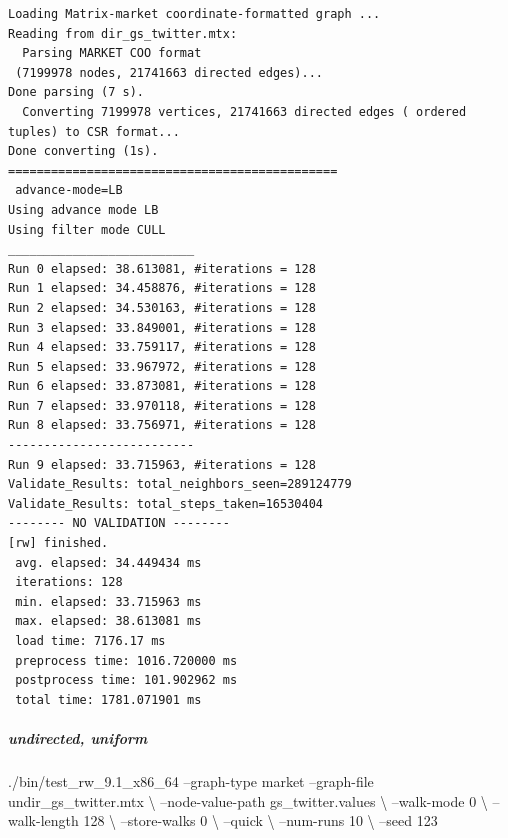 \documentclass[10pt,oneside]{memoir}
\newenvironment{Shaded}{}{}
\newcommand{\ExtensionTok}[1]{#1}
\newcommand{\NormalTok}[1]{#1}
\let\oldsubparagraph\subparagraph
\renewcommand{\subparagraph}[1]{\oldsubparagraph{#1}\mbox{}}
\begin{document}
\begin{verbatim}
Loading Matrix-market coordinate-formatted graph ...
Reading from dir_gs_twitter.mtx:
  Parsing MARKET COO format
 (7199978 nodes, 21741663 directed edges)...
Done parsing (7 s).
  Converting 7199978 vertices, 21741663 directed edges ( ordered tuples) to CSR format...
Done converting (1s).
==============================================
 advance-mode=LB
Using advance mode LB
Using filter mode CULL
__________________________
Run 0 elapsed: 38.613081, #iterations = 128
Run 1 elapsed: 34.458876, #iterations = 128
Run 2 elapsed: 34.530163, #iterations = 128
Run 3 elapsed: 33.849001, #iterations = 128
Run 4 elapsed: 33.759117, #iterations = 128
Run 5 elapsed: 33.967972, #iterations = 128
Run 6 elapsed: 33.873081, #iterations = 128
Run 7 elapsed: 33.970118, #iterations = 128
Run 8 elapsed: 33.756971, #iterations = 128
--------------------------
Run 9 elapsed: 33.715963, #iterations = 128
Validate_Results: total_neighbors_seen=289124779
Validate_Results: total_steps_taken=16530404
-------- NO VALIDATION --------
[rw] finished.
 avg. elapsed: 34.449434 ms
 iterations: 128
 min. elapsed: 33.715963 ms
 max. elapsed: 38.613081 ms
 load time: 7176.17 ms
 preprocess time: 1016.720000 ms
 postprocess time: 101.902962 ms
 total time: 1781.071901 ms
\end{verbatim}

\hypertarget{undirected-uniform}{%
\subparagraph{undirected, uniform}\label{undirected-uniform}}

\begin{Shaded}
\begin{Highlighting}[]
\ExtensionTok{./bin/test_rw_9.1_x86_64}\NormalTok{ --graph-type market --graph-file undir_gs_twitter.mtx \textbackslash{}}
\NormalTok{    --node-value-path gs_twitter.values \textbackslash{}}
\NormalTok{    --walk-mode 0 \textbackslash{}}
\NormalTok{    --walk-length 128 \textbackslash{}}
\NormalTok{    --store-walks 0 \textbackslash{}}
\NormalTok{    --quick \textbackslash{}}
\NormalTok{    --num-runs 10 \textbackslash{}}
\NormalTok{    --seed 123}
\end{Highlighting}
\end{Shaded}
\end{document}
